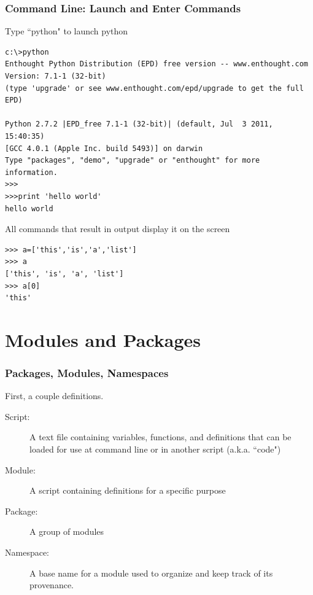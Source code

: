 \documentclass{beamer}
\begin{document}
\begin{frame}[fragile]
\frametitle{Command Line: Launch and Enter Commands}

Type ``python" to launch python
\begin{lstlisting}
c:\>python
Enthought Python Distribution (EPD) free version -- www.enthought.com
Version: 7.1-1 (32-bit)
(type 'upgrade' or see www.enthought.com/epd/upgrade to get the full EPD)

Python 2.7.2 |EPD_free 7.1-1 (32-bit)| (default, Jul  3 2011, 15:40:35) 
[GCC 4.0.1 (Apple Inc. build 5493)] on darwin
Type "packages", "demo", "upgrade" or "enthought" for more information.
>>>
>>>print 'hello world'
hello world
\end{lstlisting}
\pause
All commands that result in output display it on the screen
\begin{lstlisting}
>>> a=['this','is','a','list']
>>> a
['this', 'is', 'a', 'list']
>>> a[0]
'this'
\end{lstlisting}

\end{frame}

\section[]{Modules and Packages}
\begin{frame}[fragile]
\frametitle{Packages, Modules, Namespaces}
First, a couple definitions.
\begin{description}
\item[Script:] A text file containing variables, functions, and definitions that can be 
 loaded for use at command line or in another script (a.k.a. ``code")
\item[Module:] A script containing definitions for a specific purpose
\item[Package:] A group of modules
\item[Namespace:] A base name for a module used to organize and keep track of its provenance.
\end{description}
\end{frame}
\end{document}
